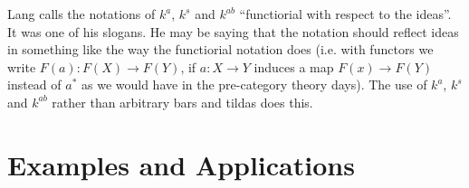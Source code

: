 \begin{bergman}
    Lang calls the notations of $k^a$, $k^s$ and $k^{ab}$ ``functiorial with respect to the ideas''. It was one of his slogans. He may be saying that the notation should reflect ideas in something like the way the functiorial notation does (i.e. with functors we write $F(a)\colon F(X)\rightarrow F(Y)$, if $a\colon X\rightarrow Y$ induces a map $F(x)\rightarrow F(Y)$ instead of $a^\ast$ as we would have in the pre-category theory days). 
    The use of $k^a$, $k^s$ and $k^{ab}$ rather than arbitrary bars and tildas does this.
\end{bergman}
\section{Examples and Applications}

\printindex
